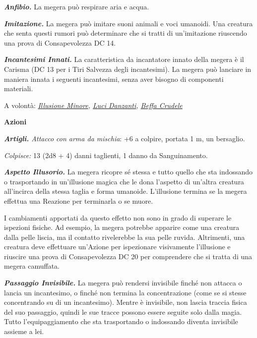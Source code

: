 \begin{multicols}{2}
{\emph{\textbf{Anfibio.}} La megera può respirare aria e acqua.

\emph{\textbf{Imitazione.}} La megera può imitare suoni animali e voci umanoidi. Una creatura che senta questi rumori può determinare che si tratti di un'imitazione riuscendo una prova di Consapevolezza DC 14.

\emph{\textbf{Incantesimi Innati.}} La caratteristica da incantatore innato della megera è il Carisma (DC 13 per i Tiri Salvezza degli incantesimi). La megera può lanciare in maniera innata i seguenti incantesimi, senza aver bisogno di componenti materiali.

A volontà: \emph{\hyperlink{Illusione Minore}{Illusione Minore}, \hyperlink{Luci Danzanti}{Luci Danzanti}, \hyperlink{Beffa Crudele}{Beffa Crudele}}

\textbf{Azioni}

\emph{\textbf{Artigli.} Attacco con arma da mischia}: +6 a colpire, portata 1 m, un bersaglio.

\emph{Colpisce:} 13 (2d8 + 4) danni taglienti, 1 danno da Sanguinamento.

\emph{\textbf{Aspetto Illusorio.}} La megera ricopre sé stessa e tutto quello che sta indossando o trasportando in un'illusione magica che le dona l'aspetto di un'altra creatura all'incirca della stessa taglia e forma umanoide. L'illusione termina se la megera effettua una Reazione per terminarla o se muore.

I cambiamenti apportati da questo effetto non sono in grado di superare le ispezioni fisiche. Ad esempio, la megera potrebbe apparire come una creatura dalla pelle liscia, ma il contatto rivelerebbe la sua pelle ruvida. Altrimenti, una creatura deve effettuare un'Azione per ispezionare visivamente l'illusione e riuscire una prova di Consapevolezza DC 20 per comprendere che si tratta di una megera camuffata.

\emph{\textbf{Passaggio Invisibile.}} La megera può rendersi invisibile finché non attacca o lancia un incantesimo, o finché non termina la concentrazione (come se si stesse concentrando su di un incantesimo). Mentre è invisibile, non lascia traccia fisica del suo passaggio, quindi le sue tracce possono essere seguite solo dalla magia. Tutto l'equipaggiamento che sta trasportando o indossando diventa invisibile assieme a lei.

}
\end{multicols}
